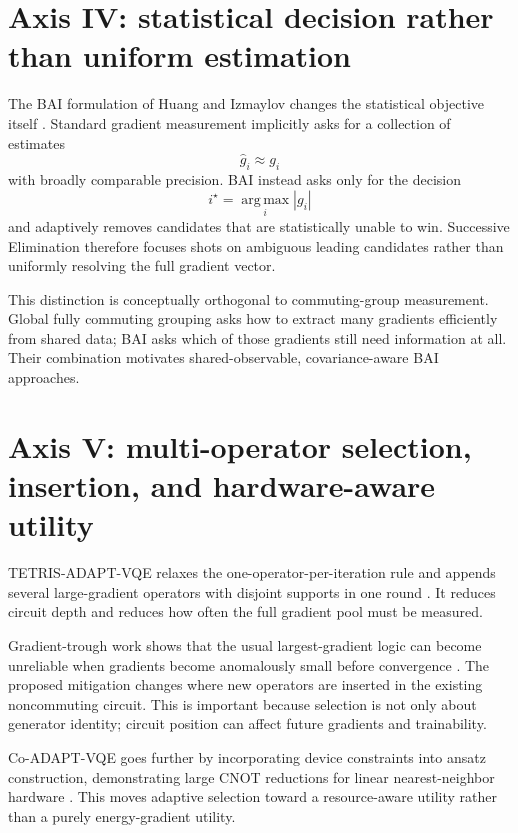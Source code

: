 \documentclass[11pt]{article}
\newcommand{\argmax}{\operatorname*{arg\,max}}
\begin{document}
\section{Axis IV: statistical decision rather than uniform estimation}

The BAI formulation of Huang and Izmaylov changes the statistical objective itself \cite{Huang2026}. Standard gradient measurement implicitly asks for a collection of estimates
\begin{equation}
    \widehat g_i\approx g_i
\end{equation}
with broadly comparable precision. BAI instead asks only for the decision
\begin{equation}
    i^\star=\argmax_i |g_i|
\end{equation}
and adaptively removes candidates that are statistically unable to win. Successive Elimination therefore focuses shots on ambiguous leading candidates rather than uniformly resolving the full gradient vector.

This distinction is conceptually orthogonal to commuting-group measurement. Global fully commuting grouping asks how to extract many gradients efficiently from shared data; BAI asks which of those gradients still need information at all. Their combination motivates shared-observable, covariance-aware BAI approaches.

\section{Axis V: multi-operator selection, insertion, and hardware-aware utility}

TETRIS-ADAPT-VQE relaxes the one-operator-per-iteration rule and appends several large-gradient operators with disjoint supports in one round \cite{Anastasiou2024TETRIS}. It reduces circuit depth and reduces how often the full gradient pool must be measured.

Gradient-trough work shows that the usual largest-gradient logic can become unreliable when gradients become anomalously small before convergence \cite{Stadelmann2025}. The proposed mitigation changes where new operators are inserted in the existing noncommuting circuit. This is important because selection is not only about generator identity; circuit position can affect future gradients and trainability.

Co-ADAPT-VQE goes further by incorporating device constraints into ansatz construction, demonstrating large CNOT reductions for linear nearest-neighbor hardware \cite{Ramoa2026CoDesign}. This moves adaptive selection toward a resource-aware utility rather than a purely energy-gradient utility.
\end{document}
